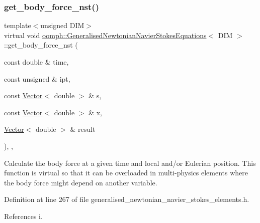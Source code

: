 \subsubsection{\texorpdfstring{get\+\_\+body\+\_\+force\+\_\+nst()}{get\_body\_force\_nst()}}
{\footnotesize\ttfamily template$<$unsigned D\+IM$>$ \\
virtual void \hyperlink{classoomph_1_1GeneralisedNewtonianNavierStokesEquations}{oomph\+::\+Generalised\+Newtonian\+Navier\+Stokes\+Equations}$<$ D\+IM $>$\+::get\+\_\+body\+\_\+force\+\_\+nst (\begin{DoxyParamCaption}\item[{const double \&}]{time,  }\item[{const unsigned \&}]{ipt,  }\item[{const \hyperlink{classoomph_1_1Vector}{Vector}$<$ double $>$ \&}]{s,  }\item[{const \hyperlink{classoomph_1_1Vector}{Vector}$<$ double $>$ \&}]{x,  }\item[{\hyperlink{classoomph_1_1Vector}{Vector}$<$ double $>$ \&}]{result }\end{DoxyParamCaption})\hspace{0.3cm}{\ttfamily [inline]}, {\ttfamily [protected]}, {\ttfamily [virtual]}}



Calculate the body force at a given time and local and/or Eulerian position. This function is virtual so that it can be overloaded in multi-\/physics elements where the body force might depend on another variable. 



Definition at line 267 of file generalised\+\_\+newtonian\+\_\+navier\+\_\+stokes\+\_\+elements.\+h.



References i.

\mbox{\label{classoomph_1_1GeneralisedNewtonianNavierStokesEquations_a2c26367aca1f2c400f69d63786474eb8}} 
